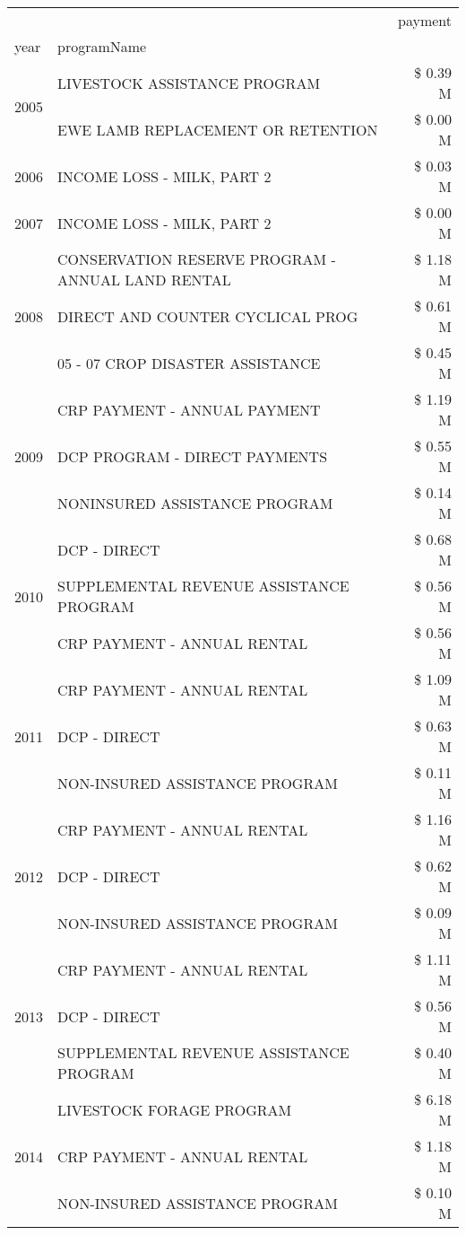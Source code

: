 \begin{tabular}{llr}
\toprule
 &  & payment \\
year & programName &  \\
\midrule
\multirow[t]{2}{*}{2005} & LIVESTOCK ASSISTANCE PROGRAM & \$ 0.39 M \\
 & EWE LAMB REPLACEMENT OR RETENTION & \$ 0.00 M \\
\cline{1-3}
2006 & INCOME LOSS - MILK, PART 2 & \$ 0.03 M \\
\cline{1-3}
2007 & INCOME LOSS - MILK, PART 2 & \$ 0.00 M \\
\cline{1-3}
\multirow[t]{3}{*}{2008} & CONSERVATION RESERVE PROGRAM - ANNUAL LAND RENTAL & \$ 1.18 M \\
 & DIRECT AND COUNTER CYCLICAL PROG & \$ 0.61 M \\
 & 05 - 07 CROP DISASTER ASSISTANCE & \$ 0.45 M \\
\cline{1-3}
\multirow[t]{3}{*}{2009} & CRP PAYMENT - ANNUAL PAYMENT & \$ 1.19 M \\
 & DCP PROGRAM - DIRECT PAYMENTS & \$ 0.55 M \\
 & NONINSURED ASSISTANCE PROGRAM & \$ 0.14 M \\
\cline{1-3}
\multirow[t]{3}{*}{2010} & DCP - DIRECT & \$ 0.68 M \\
 & SUPPLEMENTAL REVENUE ASSISTANCE PROGRAM & \$ 0.56 M \\
 & CRP PAYMENT - ANNUAL RENTAL & \$ 0.56 M \\
\cline{1-3}
\multirow[t]{3}{*}{2011} & CRP PAYMENT - ANNUAL RENTAL & \$ 1.09 M \\
 & DCP - DIRECT & \$ 0.63 M \\
 & NON-INSURED ASSISTANCE PROGRAM & \$ 0.11 M \\
\cline{1-3}
\multirow[t]{3}{*}{2012} & CRP PAYMENT - ANNUAL RENTAL & \$ 1.16 M \\
 & DCP - DIRECT & \$ 0.62 M \\
 & NON-INSURED ASSISTANCE PROGRAM & \$ 0.09 M \\
\cline{1-3}
\multirow[t]{3}{*}{2013} & CRP PAYMENT - ANNUAL RENTAL & \$ 1.11 M \\
 & DCP - DIRECT & \$ 0.56 M \\
 & SUPPLEMENTAL REVENUE ASSISTANCE PROGRAM & \$ 0.40 M \\
\cline{1-3}
\multirow[t]{3}{*}{2014} & LIVESTOCK FORAGE PROGRAM & \$ 6.18 M \\
 & CRP PAYMENT - ANNUAL RENTAL & \$ 1.18 M \\
 & NON-INSURED ASSISTANCE PROGRAM & \$ 0.10 M \\

\end{tabular}
